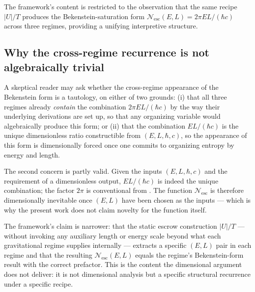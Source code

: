 \documentclass[11pt]{article}
\begin{document}
The framework's content is restricted to the observation that the same recipe $|U|/T$ produces the Bekenstein-saturation form $\mathcal{N}_{\mathrm{esc}}(E, L) = 2\pi E L/(\hbar c)$ across three regimes, providing a unifying interpretive structure.

\subsection{Why the cross-regime recurrence is not algebraically trivial}

A skeptical reader may ask whether the cross-regime appearance of the Bekenstein form is a tautology, on either of two grounds: (i) that all three regimes already \emph{contain} the combination $2\pi E L/(\hbar c)$ by the way their underlying derivations are set up, so that any organizing variable would algebraically produce this form; or (ii) that the combination $E L/(\hbar c)$ is the unique dimensionless ratio constructible from $(E, L, \hbar, c)$, so the appearance of this form is dimensionally forced once one commits to organizing entropy by energy and length.

The second concern is partly valid. Given the inputs $(E, L, \hbar, c)$ and the requirement of a dimensionless output, $EL/(\hbar c)$ is indeed the unique combination; the factor $2\pi$ is conventional from \cite{Bekenstein1981}. The function $\mathcal{N}_{\mathrm{esc}}$ is therefore dimensionally inevitable once $(E, L)$ have been chosen as the inputs — which is why the present work does not claim novelty for the function itself.

The framework's claim is narrower: that the static escrow construction $|U|/T$ — without invoking any auxiliary length or energy scale beyond what each gravitational regime supplies internally — extracts a specific $(E, L)$ pair in each regime and that the resulting $\mathcal{N}_{\mathrm{esc}}(E, L)$ equals the regime's Bekenstein-form result with the correct prefactor. This is the content the dimensional argument does not deliver: it is not dimensional analysis but a specific structural recurrence under a specific recipe.
\end{document}
